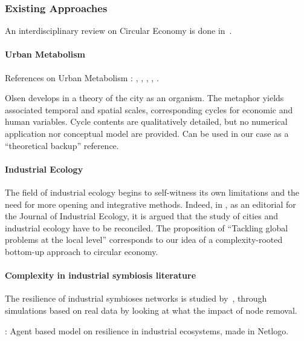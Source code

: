 \documentclass[fleqn,10pt]{wlscirep}
\begin{document}

\subsubsection*{Existing Approaches}


An interdisciplinary review on Circular Economy is done in~\cite{ghisellini2016review}.


\paragraph*{Urban Metabolism}

References on Urban Metabolism : \cite{kennedy2007changing}, \cite{kennedy2011study}, \cite{newcombe1978metabolism}, \cite{bodini2012cities}, \cite{hoornwegmainstreaming}.

Olsen develops in \cite{olsen1982urban} a theory of the city as an organism. The metaphor yields associated temporal and spatial scales, corresponding cycles for economic and human variables. Cycle contents are qualitatively detailed, but no numerical application nor conceptual model are provided. Can be used in our case as a “theoretical backup” reference.


\paragraph{Industrial Ecology}

The field of industrial ecology begins to self-witness its own limitations and the need for more opening and integrative methods. Indeed, in \cite{bai2007industrial}, as an editorial for the Journal of Industrial Ecology, it is argued that the study of cities and industrial ecology have to be reconciled. The proposition of ``Tackling global problems at the local level'' corresponds to our idea of a complexity-rooted bottom-up approach to circular economy.


\paragraph{Complexity in industrial symbiosis literature}

The resilience of industrial symbioses networks is studied by~\cite{li2015resilience}, through simulations based on real data by looking at what the impact of node removal.

\cite{zhu2013exploring} : Agent based model on resilience in industrial ecosystems, made in Netlogo.
\end{document}
